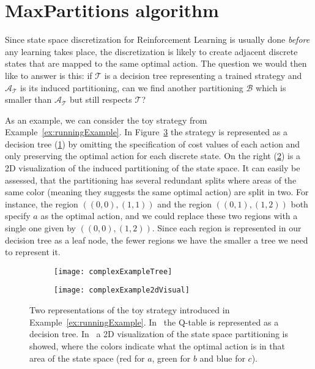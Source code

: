 \section{MaxPartitions algorithm}%
\label{sec:maxParts}

Since state space discretization for Reinforcement Learning is usually done
\textit{before} any learning takes place, the discretization is likely to create
adjacent discrete states that are mapped to the same optimal action. The
question we would then like to answer is this: if $\mathcal{T}$ is a decision
tree representing a trained strategy and $\mathcal{A}_{\mathcal{T}}$ is its
induced partitioning, can we find another partitioning $\mathcal{B}$ which is
smaller than $\mathcal{A}_{\mathcal{T}}$ but still respects $\mathcal{T}$?

As an example, we can consider the toy strategy from
Example~\ref{ex:runningExample}. In Figure~\ref{fig:complexExample} the strategy
is represented as a decision tree (\ref{fig:complexExampleTree}) by omitting the
specification of cost values of each action and only preserving the optimal
action for each discrete state. On the right (\ref{fig:complexExample2dVisual})
is a 2D visualization of the induced partitioning of the state space. It can
easily be assessed, that the partitioning has several redundant splits where
areas of the same color (meaning they suggests the same optimal action) are
split in two. For instance, the region $((0,0),(1,1))$ and the region
$((0,1),(1,2))$ both specify $a$ as the optimal action, and we could replace
these two regions with a single one given by $((0,0),(1,2))$.  Since each region
is represented in our decision tree as a leaf node, the fewer regions we have
the smaller a tree we need to represent it.

\begin{figure}[ht]
    \begin{subfigure}[b]{.5\textwidth}
        \centering
        \texttt{[image: complexExampleTree]}
        \subcaption{%
        }\label{fig:complexExampleTree}
    \end{subfigure}
    \begin{subfigure}[b]{.5\textwidth}
        \centering
        \texttt{[image: complexExample2dVisual]}
        \subcaption{%
        }\label{fig:complexExample2dVisual}
    \end{subfigure}%

    \caption{%
        Two representations of the toy strategy introduced in
        Example~\ref{ex:runningExample}. In~ the
        Q-table is represented as a decision tree.
        In~ a 2D visualization of the state
        space partitioning is showed, where the colors indicate what the optimal
        action is in that area of the state space (red for $a$, green for $b$
        and blue for $c$).
    }%
    \label{fig:complexExample}
\end{figure}

